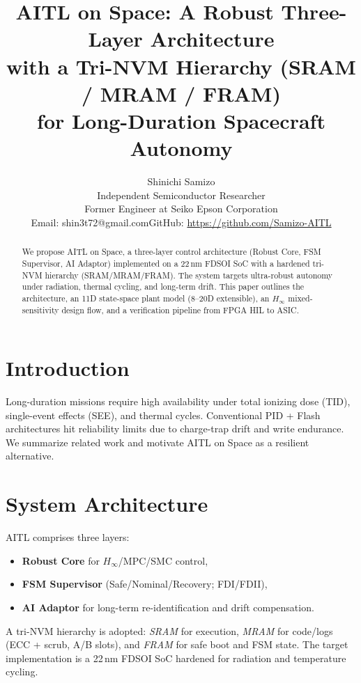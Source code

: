 \documentclass[conference]{IEEEtran}
\begin{document}
\title{AITL on Space: A Robust Three-Layer Architecture\\
with a Tri-NVM Hierarchy (SRAM / MRAM / FRAM)\\
for Long-Duration Spacecraft Autonomy}

\author{Shinichi Samizo\\
Independent Semiconductor Researcher\\
Former Engineer at Seiko Epson Corporation\\
Email: shin3t72@gmail.com\quad GitHub: \url{https://github.com/Samizo-AITL}
}

\maketitle

\begin{abstract}
We propose AITL on Space, a three-layer control architecture (Robust Core, FSM Supervisor, AI Adaptor) implemented on a 22\,nm FDSOI SoC with a hardened tri-NVM hierarchy (SRAM/MRAM/FRAM). The system targets ultra-robust autonomy under radiation, thermal cycling, and long-term drift. This paper outlines the architecture, an 11D state-space plant model (8--20D extensible), an $H_\infty$ mixed-sensitivity design flow, and a verification pipeline from FPGA HIL to ASIC.
\end{abstract}

\section{Introduction}
Long-duration missions require high availability under total ionizing dose (TID), single-event effects (SEE), and thermal cycles. Conventional PID + Flash architectures hit reliability limits due to charge-trap drift and write endurance. We summarize related work and motivate AITL on Space as a resilient alternative.

\section{System Architecture}
AITL comprises three layers:
\begin{itemize}
  \item \textbf{Robust Core} for $H_\infty$/MPC/SMC control,
  \item \textbf{FSM Supervisor} (Safe/Nominal/Recovery; FDI/FDII),
  \item \textbf{AI Adaptor} for long-term re-identification and drift compensation.
\end{itemize}
A tri-NVM hierarchy is adopted: \emph{SRAM} for execution, \emph{MRAM} for code/logs (ECC + scrub, A/B slots), and \emph{FRAM} for safe boot and FSM state. The target implementation is a 22\,nm FDSOI SoC hardened for radiation and temperature cycling.
\end{document}
